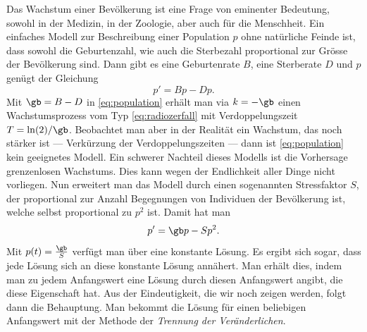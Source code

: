 \documentclass[%
11pt,%
twoside,%
titlepage,%
german,%
headsepline%
]{scrartcl}
\begin{document}
Das
Wachstum einer Bev\"olkerung ist eine Frage von eminenter Bedeutung, sowohl in der Medizin, in der Zoologie, aber auch f\"ur die Menschheit.
Ein einfaches Modell zur Beschreibung einer Population $p$ ohne nat\"urliche Feinde ist, dass sowohl die Geburtenzahl, wie auch die Sterbezahl proportional zur Gr\"osse der Bev\"olkerung sind. Dann gibt es eine Geburtenrate $B$, eine Sterberate $D$ und $p$ gen\"ugt der Gleichung
\begin{equation}\label{eq:population}
p'=Bp-Dp.
\end{equation}
Mit $\gb=B-D$ in \eqref{eq:population} erh\"alt man via $k=-\gb$ einen Wachstumsprozess vom Typ \eqref{eq:radiozerfall} mit Verdoppelungszeit $T=\ln(2)/\gb$. Beobachtet man aber in der Realit\"at ein Wachstum, das noch st\"arker ist --- Verk\"urzung der Verdoppelungszeiten --- dann ist \eqref{eq:population} kein geeignetes Modell. Ein schwerer Nachteil dieses Modells ist die Vorhersage grenzenlosen Wachstums. Dies kann wegen der Endlichkeit aller Dinge nicht vorliegen. Nun erweitert man das Modell durch einen sogenannten Stressfaktor $S$, der proportional zur Anzahl Begegnungen von Individuen der Bev\"olkerung ist, welche selbst proportional zu $p^2$ ist. Damit hat man
\begin{equation}\label{eq:populationstress}
p'=\gb p-Sp^2.
\end{equation}
Mit $p(t)=\frac{\gb}{S}$
verf\"ugt man \"uber eine konstante L\"osung. Es ergibt sich sogar, dass jede L\"osung sich an diese konstante L\"osung ann\"ahert. Man erh\"alt dies, indem man zu jedem Anfangswert eine L\"osung durch diesen Anfangswert angibt, die diese Eigenschaft hat. Aus der Eindeutigkeit, die wir noch zeigen werden, folgt dann die Behauptung. Man bekommt die L\"osung f\"ur einen beliebigen Anfangswert mit der Methode der \emph{Trennung der Ver\"anderlichen}.
\end{document}
